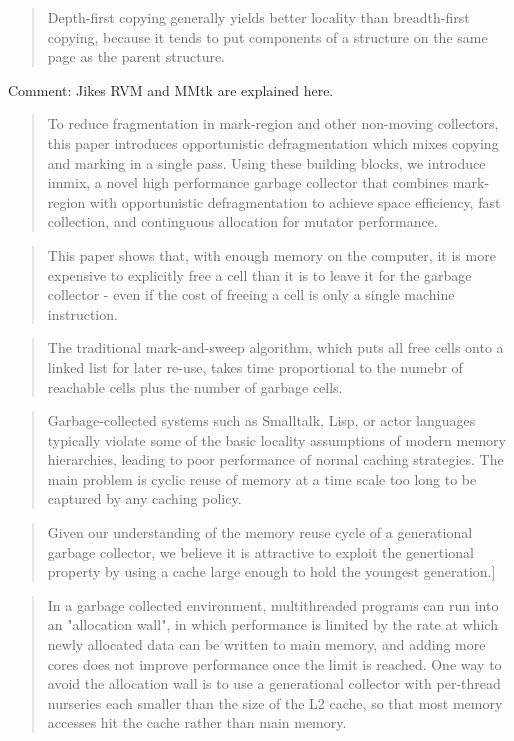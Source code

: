 \documentclass[a4paper,oneside]{memoir}
\newcommand{\makecomment}[1]{{\color{red} Comment: #1}}
\begin{document}
\blockquote{Depth-first copying generally yields better locality than
breadth-first copying, because it tends to put components of a structure on the
same page as the parent structure.}
\cite{Moon:1984}

\makecomment{Jikes RVM and MMtk are explained here.}\cite{Blackburn:2004}

\blockquote{To reduce fragmentation in mark-region and other non-moving
collectors, this paper introduces opportunistic defragmentation which mixes
copying and marking in a single pass. Using these building blocks, we introduce
immix, a novel high performance garbage collector that combines mark-region with
opportunistic defragmentation to achieve space efficiency, fast collection, and
continguous allocation for mutator performance.\cite{Blackburn:2008}}

\blockquote{This paper shows that, with enough memory on the computer, it is
more expensive to explicitly free a cell than it is to leave it for the garbage
collector - even if the cost of freeing a cell is only a single machine
instruction.}
\cite{Appel:1987}

\blockquote{The traditional mark-and-sweep algorithm, which puts all free cells
onto a linked list for later re-use, takes time proportional to the numebr of
reachable cells plus the number of garbage cells.}
\cite{Appel:1987}

\blockquote{Garbage-collected systems such as Smalltalk, Lisp, or actor languages typically violate some of the basic locality assumptions of modern memory hierarchies, leading to poor performance of normal caching strategies. The main problem is cyclic reuse of memory at a time scale too long to be captured by any caching policy. \cite{Lam:1992}}


\blockquote{Given our understanding of the memory reuse cycle of a generational
garbage collector, we believe it is attractive to exploit the genertional
property by using a cache large enough to hold the youngest generation.]}
\cite{Lam:1992}

\blockquote{In a garbage collected environment, multithreaded programs can run
into an "allocation wall", in which performance is limited by the rate at which
newly allocated data can be written to main memory, and adding more cores does
not improve performance once the limit is reached. One way to avoid the
allocation wall is to use a generational collector with per-thread nurseries
each smaller than the size of the L2 cache, so that most memory accesses hit the
cache rather than main memory. \cite{Marlow:2011}}
\end{document}
